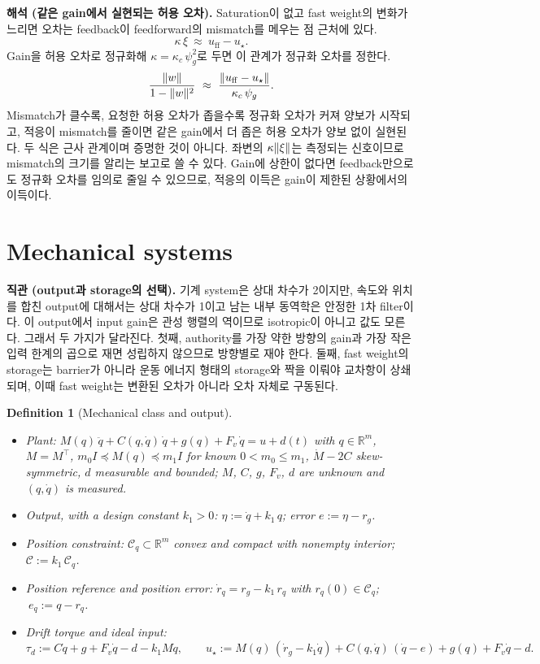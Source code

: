 \documentclass[11pt]{article}\usepackage[margin=1in]{geometry}\usepackage{amsmath,amssymb,amsthm,mathtools}\usepackage{graphicx}\graphicspath{{figures/}{../figures/}{figs/}{./}}\usepackage{enumitem}\usepackage{hyperref}\usepackage{cleveref}\usepackage{tikz}\usetikzlibrary{arrows.meta,positioning,calc,shapes.geometric}\usepackage{float}\usepackage[most]{tcolorbox}\usepackage{kotex}\usepackage{booktabs}\emergencystretch=1.6em\tolerance=2000 \crefname{assumption}{Assumption}{Assumptions}\Crefname{assumption}{Assumption}{Assumptions}\crefname{definition}{Definition}{Definitions}\Crefname{definition}{Definition}{Definitions}\crefname{proposition}{Proposition}{Propositions}\Crefname{proposition}{Proposition}{Propositions}\crefname{fact}{Fact}{Facts}\Crefname{fact}{Fact}{Facts} \newtheorem{assumption}{Assumption}\newtheorem{definition}{Definition}\newtheorem{lemma}{Lemma}\newtheorem{proposition}{Proposition}\newtheorem{theorem}{Theorem}\newtheorem{corollary}{Corollary}\newtheorem{fact}{Fact}\theoremstyle{remark}\newtheorem{remark}{Remark} \newcommand{\R}{\mathbb{R}}\newcommand{\U}{\mathcal U}
\newcommand{\Cset}{\mathcal C}\newcommand{\Pcl}{\mathcal P}\newcommand{\Zset}{\mathcal Z_0}\newcommand{\Xset}{\mathcal X_0}
\begin{document}
\textbf{해석 (같은 gain에서 실현되는 허용 오차).} Saturation이 없고 fast weight의 변화가 느리면 오차는 feedback이 feedforward의 mismatch를 메우는 점 근처에 있다.
\[
\kappa\,\xi\ \approx\ u_{\mathrm{ff}}-u_\star .
\]
Gain을 허용 오차로 정규화해 $\kappa=\kappa_c\,\psi_g^2$로 두면 이 관계가 정규화 오차를 정한다.
\[
\frac{\norm{w}}{1-\norm{w}^2}\ \approx\ \frac{\norm{u_{\mathrm{ff}}-u_\star}}{\kappa_c\,\psi_g} .
\]
Mismatch가 클수록, 요청한 허용 오차가 좁을수록 정규화 오차가 커져 양보가 시작되고, 적응이 mismatch를 줄이면 같은 gain에서 더 좁은 허용 오차가 양보 없이 실현된다. 두 식은 근사 관계이며 증명한 것이 아니다. 좌변의 $\kappa\lVert \xi\rVert$는 측정되는 신호이므로 mismatch의 크기를 알리는 보고로 쓸 수 있다. Gain에 상한이 없다면 feedback만으로도 정규화 오차를 임의로 줄일 수 있으므로, 적응의 이득은 gain이 제한된 상황에서의 이득이다.

\section{Mechanical systems}
\label{sec:mech}

\textbf{직관 (output과 storage의 선택).} 기계 system은 상대 차수가 2이지만, 속도와 위치를 합친 output에 대해서는 상대 차수가 1이고 남는 내부 동역학은 안정한 1차 filter이다. 이 output에서 input gain은 관성 행렬의 역이므로 isotropic이 아니고 값도 모른다. 그래서 두 가지가 달라진다. 첫째, authority를 가장 약한 방향의 gain과 가장 작은 입력 한계의 곱으로 재면 성립하지 않으므로 방향별로 재야 한다. 둘째, fast weight의 storage는 barrier가 아니라 운동 에너지 형태의 storage와 짝을 이뤄야 교차항이 상쇄되며, 이때 fast weight는 변환된 오차가 아니라 오차 자체로 구동된다.

\begin{definition}[Mechanical class and output]
\label{def:mech}
\begin{itemize}
\item Plant: $M(q)\,\ddot q+C(q,\dot q)\,\dot q+g(q)+F_v\,\dot q=u+d(t)$ with $q\in\R^m$, $M=M^\top$, $m_0I\preceq M(q)\preceq m_1I$ for known $0<m_0\le m_1$, $\dot M-2C$ skew-symmetric, $d$ measurable and bounded; $M$, $C$, $g$, $F_v$, $d$ are unknown and $(q,\dot q)$ is measured.
\item Output, with a design constant $k_1>0$: $\eta:=\dot q+k_1\,q$; error $e:=\eta-r_g$.
\item Position constraint: $\Cset_q\subset\R^m$ convex and compact with nonempty interior; $\Cset:=k_1\,\Cset_q$.
\item Position reference and position error: $\dot r_q=r_g-k_1\,r_q$ with $r_q(0)\in\Cset_q$; $\ e_q:=q-r_q$.
\item Drift torque and ideal input:
\[
\tau_d:=C\dot q+g+F_v\dot q-d-k_1M\dot q,\qquad u_\star:=M(q)\,(\dot r_g-k_1\dot q)+C(q,\dot q)\,(\dot q-e)+g(q)+F_v\dot q-d .
\]
\end{itemize}
\end{definition}
\end{document}
